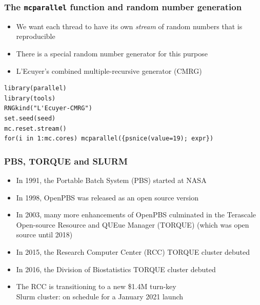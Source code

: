 \documentclass[11pt,pdftex,dvipsnames,usenames,helvetica]{beamer}
\begin{document}
\begin{frame}[fragile] 
\frametitle{The {\tt mcparallel} function and random number generation}
\begin{itemize}
\item We want each thread to have its own {\it stream} of random numbers
that is reproducible
\item There is a special random number generator for this purpose
\item L'Ecuyer's combined multiple-recursive generator (CMRG)
\end{itemize}
\begin{verbatim}
library(parallel) 
library(tools)
RNGkind("L'Ecuyer-CMRG")
set.seed(seed)
mc.reset.stream()
for(i in 1:mc.cores) mcparallel({psnice(value=19); expr})
\end{verbatim}
\end{frame}

\begin{frame}[fragile] 
\frametitle{PBS, TORQUE and SLURM}
\begin{itemize}
\item In 1991, the Portable Batch System (PBS) started at NASA
\item In 1998, OpenPBS was released as an open source version
\item In 2003, many more enhancements of OpenPBS culminated in the 
Terascale Open-source Resource and QUEue Manager (TORQUE)
(which was open source until 2018)
\item In 2015, the Research Computer Center (RCC) TORQUE cluster debuted
\item In 2016, the Division of Biostatistics TORQUE cluster debuted
\item The RCC is transitioning to a new \$1.4M turn-key\\
Slurm cluster: on schedule for a January 2021 launch 
\end{itemize}
\end{frame}
\end{document}

